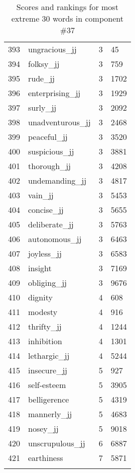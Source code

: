 \begin{longtable}[!htbp]{| rlr@{.}l |}
    393 & ungracious\_jj & 3 & 45 \\
    394 & folksy\_jj & 3 & 759 \\
    395 & rude\_jj & 3 & 1702 \\
    396 & enterprising\_jj & 3 & 1929 \\
    397 & surly\_jj & 3 & 2092 \\
    398 & unadventurous\_jj & 3 & 2468 \\
    399 & peaceful\_jj & 3 & 3520 \\
    400 & suspicious\_jj & 3 & 3881 \\
    401 & thorough\_jj & 3 & 4208 \\
    402 & undemanding\_jj & 3 & 4817 \\
    403 & vain\_jj & 3 & 5453 \\
    404 & concise\_jj & 3 & 5655 \\
    405 & deliberate\_jj & 3 & 5763 \\
    406 & autonomous\_jj & 3 & 6463 \\
    407 & joyless\_jj & 3 & 6583 \\
    408 & insight & 3 & 7169 \\
    409 & obliging\_jj & 3 & 9676 \\
    410 & dignity & 4 & 608 \\
    411 & modesty & 4 & 916 \\
    412 & thrifty\_jj & 4 & 1244 \\
    413 & inhibition & 4 & 1301 \\
    414 & lethargic\_jj & 4 & 5244 \\
    415 & insecure\_jj & 5 & 927 \\
    416 & self-esteem & 5 & 3905 \\
    417 & belligerence & 5 & 4319 \\
    418 & mannerly\_jj & 5 & 4683 \\
    419 & nosey\_jj & 5 & 9018 \\
    420 & unscrupulous\_jj & 6 & 6887 \\
    421 & earthiness & 7 & 5871 \\
    \hline
    \caption{Scores and rankings for most extreme 30 words in component \#37} \\
\end{longtable}
